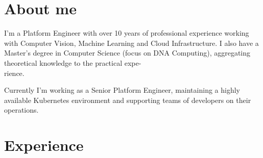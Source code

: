 \documentclass[a4paper]{cv-friggeri-x}
\begin{document}

\section{About me}
I'm a Platform Engineer with over 10 years of professional experience working with Computer Vision, Machine Learning and Cloud Infrastructure. I also have a Master's degree in Computer Science (focus on DNA Computing), aggregating theoretical knowledge to the practical expe-\\rience.

Currently I'm working as a Senior Platform Engineer, maintaining a highly available Kubernetes environment and supporting teams of developers on their operations.



\section{Experience}

\end{document}
